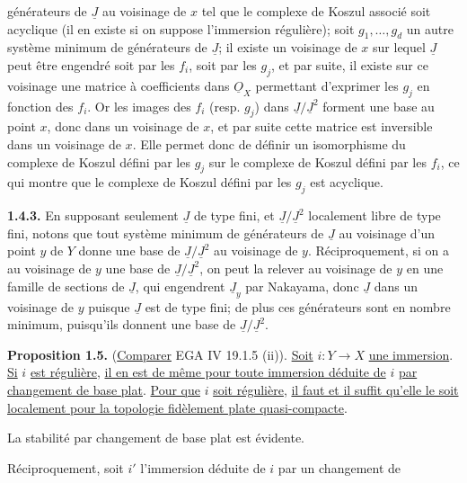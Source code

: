 
générateurs de $\underline{J}$ au voisinage de $x$ tel que le complexe de Koszul associé soit acyclique (il en existe si on suppose l'immersion régulière); soit $g_1,\ldots,g_d$ un autre système minimum de générateurs de $\underline{J}$; il existe un voisinage de $x$ sur lequel $\underline{J}$ peut être engendré soit par les $f_i$, soit par les $g_j$, et par suite, il existe sur ce voisinage une matrice à coefficients dans $\underline{O}_X$ permettant d'exprimer les $g_j$ en fonction des $f_i$. Or les images des $f_i$ (resp. $g_j$) dans $\underline{J}/\underline{J}^2$ forment une base au point $x$, donc dans un voisinage de $x$, et par suite cette matrice est inversible dans un voisinage de $x$. Elle permet donc de définir un isomorphisme du complexe de Koszul défini par les $g_j$ sur le complexe de Koszul défini par les $f_i$, ce qui montre que le complexe de Koszul défini par les $g_j$ est acyclique.

\textbf{1.4.3.} En supposant seulement $\underline{J}$ de type fini, et $\underline{J}/\underline{J}^2$ localement libre de type fini, notons que tout système minimum de générateurs de $\underline{J}$ au voisinage d'un point $y$ de $Y$ donne une base de $\underline{J}/\underline{J}^2$ au voisinage de $y$. Réciproquement, si on a au voisinage de $y$ une base de $\underline{J}/\underline{J}^2$, on peut la relever au voisinage de $y$ en une famille de sections de $\underline{J}$, qui engendrent $\underline{J}_y$ par Nakayama, donc $\underline{J}$ dans un voisinage de $y$ puisque $\underline{J}$ est de type fini; de plus ces générateurs sont en nombre minimum, puisqu'ils donnent une base de $\underline{J}/\underline{J}^2$.

\textbf{Proposition 1.5.} (\uline{Comparer} EGA IV 19.1.5 (ii)). \uline{Soit} $i:Y\longrightarrow X$ \uline{une immersion}. \uline{Si} $i$ \uline{est régulière}, \uline{il en est de même pour toute immersion déduite de} $i$ \uline{par changement de base plat}. \uline{Pour que} $i$ \uline{soit régulière}, \uline{il faut et il suffit qu'elle le soit localement pour la topologie fidèlement plate quasi-compacte}.

La stabilité par changement de base plat est évidente.

Réciproquement, soit $i'$ l'immersion déduite de $i$ par un changement de
